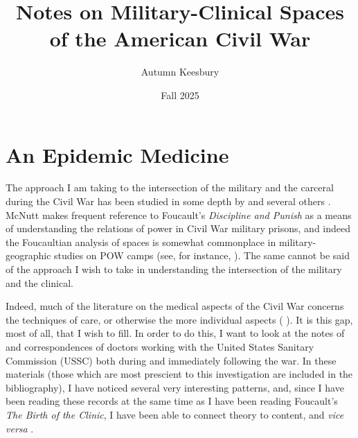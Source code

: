 \documentclass{report}
\title{Notes on Military-Clinical Spaces of the American Civil War}
\author{Autumn Keesbury}
\date{Fall 2025}
\begin{document}
  \maketitle

  \newpage
  \renewcommand\thepage{\romannumeral\numexpr\value{page}-1\relax}
  \tableofcontents
  \newpage


  \pagestyle{fancy}

  \chapter{An Epidemic Medicine}\label{chap: epidemic} %
  
  The approach I am taking to the intersection of the military and the carceral during the Civil War has been studied in some depth by \citeauthor{McNutt2024}
  and several others \autocites{McNutt2024}{McNutt2021}{McNutt2019}{McNutt2019a}. McNutt makes frequent reference to Foucault's \textit{Discipline and Punish} as a 
  means of understanding the relations of power in Civil War military prisons, and indeed the Foucaultian analysis of spaces is somewhat commonplace in military-geographic studies on POW camps (see, for instance, \citeauthor{Moran2022}). The same cannot be said of the approach I wish to take in understanding the
  intersection of the military and the clinical.

  Indeed, much of the literature on the medical aspects of the Civil War concerns the techniques of care, or otherwise the more individual aspects 
  (\citeauthor{Devine2016} ). It is this gap, most of all, that I wish to fill. In order to do this, I want to look at the notes of and
  correspondences of doctors working with the United States Sanitary Commission (USSC) both during and immediately following the war. In these materials 
  (those which are most prescient to this investigation are included in the bibliography), I have noticed several very interesting patterns, and, since I have
  been reading these records at the same time as I have been reading Foucault's \textit{The Birth of the Clinic}, I have been able to connect theory to
  content, and \textit{vice versa} \autocite{Foucault1994}.
\end{document}
